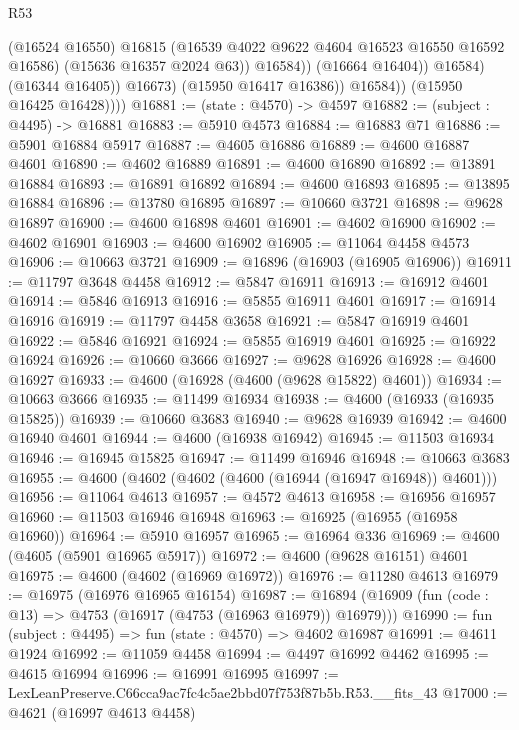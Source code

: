 \begin{lexlean}{R53}
\begin{coremodule}
                              (@16524 @16550)
                              @16815
                              (@16539 @4022 @9622 @4604 @16523 @16550 @16592 @16586)
                              (@15636 @16357 @2024 @63))
                            @16584))
                        (@16664 @16404))
                      @16584)
                    (@16344 @16405))
                  @16673)
                (@15950 @16417 @16386))
              @16584))
          (@15950 @16425 @16428))))
@16881 := (state : @4570) -> @4597
@16882 := (subject : @4495) -> @16881
@16883 := @5910 @4573
@16884 := @16883 @71
@16886 := @5901 @16884 @5917
@16887 := @4605 @16886
@16889 := @4600 @16887 @4601
@16890 := @4602 @16889
@16891 := @4600 @16890
@16892 := @13891 @16884
@16893 := @16891 @16892
@16894 := @4600 @16893
@16895 := @13895 @16884
@16896 := @13780 @16895
@16897 := @10660 @3721
@16898 := @9628 @16897
@16900 := @4600 @16898 @4601
@16901 := @4602 @16900
@16902 := @4602 @16901
@16903 := @4600 @16902
@16905 := @11064 @4458 @4573
@16906 := @10663 @3721
@16909 := @16896 (@16903 (@16905 @16906))
@16911 := @11797 @3648 @4458
@16912 := @5847 @16911
@16913 := @16912 @4601
@16914 := @5846 @16913
@16916 := @5855 @16911 @4601
@16917 := @16914 @16916
@16919 := @11797 @4458 @3658
@16921 := @5847 @16919 @4601
@16922 := @5846 @16921
@16924 := @5855 @16919 @4601
@16925 := @16922 @16924
@16926 := @10660 @3666
@16927 := @9628 @16926
@16928 := @4600 @16927
@16933 := @4600 (@16928 (@4600 (@9628 @15822) @4601))
@16934 := @10663 @3666
@16935 := @11499 @16934
@16938 := @4600 (@16933 (@16935 @15825))
@16939 := @10660 @3683
@16940 := @9628 @16939
@16942 := @4600 @16940 @4601
@16944 := @4600 (@16938 @16942)
@16945 := @11503 @16934
@16946 := @16945 @15825
@16947 := @11499 @16946
@16948 := @10663 @3683
@16955 := @4600 (@4602 (@4602 (@4600 (@16944 (@16947 @16948)) @4601)))
@16956 := @11064 @4613
@16957 := @4572 @4613
@16958 := @16956 @16957
@16960 := @11503 @16946 @16948
@16963 := @16925 (@16955 (@16958 @16960))
@16964 := @5910 @16957
@16965 := @16964 @336
@16969 := @4600 (@4605 (@5901 @16965 @5917))
@16972 := @4600 (@9628 @16151) @4601
@16975 := @4600 (@4602 (@16969 @16972))
@16976 := @11280 @4613
@16979 := @16975 (@16976 @16965 @16154)
@16987 := @16894 (@16909 (fun (code : @13) => @4753 (@16917 (@4753 (@16963 @16979)) @16979)))
@16990 := fun (subject : @4495) => fun (state : @4570) => @4602 @16987
@16991 := @4611 @1924
@16992 := @11059 @4458
@16994 := @4497 @16992 @4462
@16995 := @4615 @16994
@16996 := @16991 @16995
@16997 := LexLeanPreserve.C66cca9ac7fc4c5ae2bbd07f753f87b5b.R53.__fits_43
@17000 := @4621 (@16997 @4613 @4458)

\end{coremodule}
\end{lexlean}
